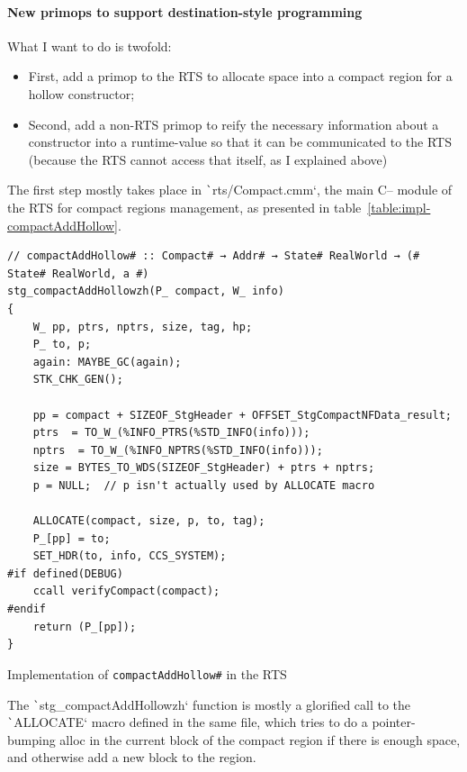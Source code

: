 \documentclass[english]{jflart}
\begin{document}
\paragraph{New primops to support destination-style programming}

What I want to do is twofold:
\begin{itemize}
\item First, add a primop to the RTS to allocate space into a compact region for a hollow constructor;
\item Second, add a non-RTS primop to reify the necessary information about a constructor into a runtime-value so that it can be communicated to the RTS (because the RTS cannot access that itself, as I explained above)
\end{itemize}

The first step mostly takes place in \texttt`rts/Compact.cmm`, the main C-- module of the RTS for compact regions management, as presented in table~\ref{table:impl-compactAddHollow}.

\begin{table}[H]
\small
\begin{verbatim}
// compactAddHollow# :: Compact# → Addr# → State# RealWorld → (# State# RealWorld, a #)
stg_compactAddHollowzh(P_ compact, W_ info)
{
    W_ pp, ptrs, nptrs, size, tag, hp;
    P_ to, p;
    again: MAYBE_GC(again);
    STK_CHK_GEN();

    pp = compact + SIZEOF_StgHeader + OFFSET_StgCompactNFData_result;
    ptrs  = TO_W_(%INFO_PTRS(%STD_INFO(info)));
    nptrs  = TO_W_(%INFO_NPTRS(%STD_INFO(info)));
    size = BYTES_TO_WDS(SIZEOF_StgHeader) + ptrs + nptrs;
    p = NULL;  // p isn't actually used by ALLOCATE macro

    ALLOCATE(compact, size, p, to, tag);
    P_[pp] = to;
    SET_HDR(to, info, CCS_SYSTEM);
#if defined(DEBUG)
    ccall verifyCompact(compact);
#endif
    return (P_[pp]);
}
\end{verbatim}
\caption{Implementation of \texttt{compactAddHollow\#} in the RTS}
\label{table:impl-compactAddHollow}
\end{table}

The \texttt`stg_compactAddHollowzh` function is mostly a glorified call to the \texttt`ALLOCATE` macro defined in the same file, which tries to do a pointer-bumping alloc in the current block of the compact region if there is enough space, and otherwise add a new block to the region.
\end{document}
